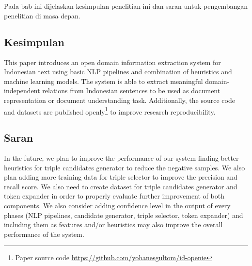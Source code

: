 \chapter{\babLima}

Pada bab ini dijelaskan kesimpulan penelitian ini dan saran untuk pengembangan penelitian di masa depan.

\section{Kesimpulan}

This paper introduces an open domain information extraction system for Indonesian text using basic NLP pipelines and combination of heuristics and machine learning models. The system is able to extract meaningful domain-independent relations from Indonesian sentences to be used as document representation or document understanding task. Additionally, the source code and datasets are published openly\footnote{Paper source code \url{https://github.com/yohanesgultom/id-openie}} to improve research reproducibility.

\section{Saran}

In the future, we plan to improve the performance of our system finding better heuristics for triple candidates generator to reduce the negative samples. We also plan adding more training data for triple selector to improve the precision and recall score. We also need to create dataset for triple candidates generator and token expander in order to properly evaluate further improvement of both components. We also consider adding confidence level in the output of every phases (NLP pipelines, candidate generator, triple selector, token expander) and including them as features and/or heuristics may also improve the overall performance of the system.